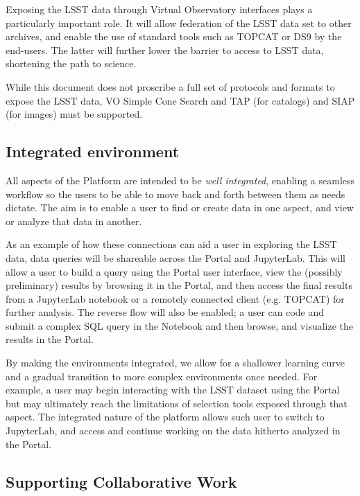 \documentclass[DM,lsstdraft,toc]{lsstdoc}
\begin{document}
Exposing the LSST data through Virtual Observatory interfaces plays a particularly 
important role. It will allow federation of the LSST data set to other
archives, and enable the use of standard tools such as TOPCAT or DS9 by the
end-users. The latter will further lower the barrier to access to LSST data, 
shortening the path to science.

While this document does not proscribe a full set of protocols and formats
to expose the LSST data, VO Simple Cone Search and TAP (for catalogs) and
SIAP (for images) must be supported.

\subsection{Integrated environment}

All aspects of the Platform are intended to be {\it well integrated}, enabling a seamless workflow so the users to be able to move back and forth between them as needs dictate.  The aim is to enable a user to find or create data in one aspect, and view or analyze that data in another.

As an example of how these connections can aid a user in exploring the LSST data, data queries will be shareable across the Portal and JupyterLab. This will allow a user to build a query using the Portal user interface, view the (possibly preliminary) results by browsing it in the Portal, and then access the final results from a JupyterLab notebook or a remotely connected client (e.g. TOPCAT) for further analysis. The reverse flow will also be enabled; a user can code and submit a complex SQL query in the Notebook and then browse, and visualize the results in the Portal.

By making the environments integrated, we allow for a shallower learning curve and a gradual transition to more complex environments once needed. For example, a user may begin interacting with the LSST dataset using the Portal but may ultimately reach the limitations of selection tools exposed through that aspect. The integrated nature of the platform allows such user to switch to JupyterLab, and access and continue working on the data hitherto analyzed in the Portal.

\subsection{Supporting Collaborative Work}
\end{document}
